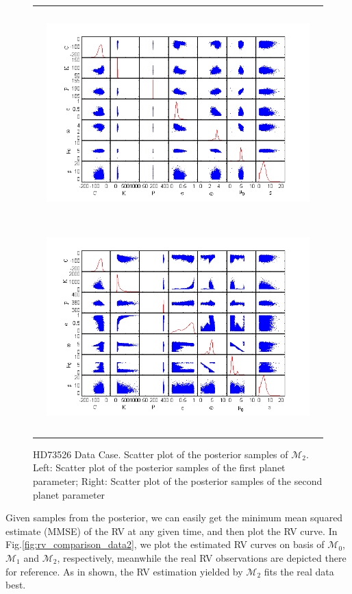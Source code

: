 \begin{figure}[!htb]
\begin{tabular}{c}
\centerline{\includegraphics[width=4in,height=3.2in]{Fig/scatter1_2p_data2.png}\includegraphics[width=4in,height=3.2in]{Fig/scatter2_2p_data2.png}}\\
\end{tabular}
\caption{HD73526 \cite{tinney20062} Data Case. Scatter plot of the
posterior samples of $\mathcal{M}_2$. Left: Scatter plot of the
posterior samples of the first planet parameter; Right: Scatter plot
of the posterior samples of the second planet parameter}
\label{fig:scatter_2p_data2}
\end{figure}


Given samples from the posterior, we can easily get the minimum mean
squared estimate (MMSE) of the RV at any given time, and then plot
the RV curve. In Fig.\ref{fig:rv_comparison_data2}, we plot the
estimated RV curves on basis of $\mathcal{M}_0$, $\mathcal{M}_1$ and
$\mathcal{M}_2$, respectively, meanwhile the real RV observations
are depicted there for reference. As in shown, the RV estimation
yielded by $\mathcal{M}_2$ fits the real data best.

